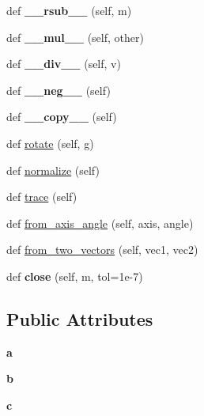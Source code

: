 \begin{DoxyCompactItemize}
def {\bfseries \+\_\+\+\_\+rsub\+\_\+\+\_\+} (self, m)
\item 
\mbox{\label{classpymavlink_1_1rotmat_1_1Matrix3_a1ef3cbd6ff8b2a5552ab1815368bea73}} 
def {\bfseries \+\_\+\+\_\+mul\+\_\+\+\_\+} (self, other)
\item 
\mbox{\label{classpymavlink_1_1rotmat_1_1Matrix3_a33b7d26f77f11815be897f21a2f846be}} 
def {\bfseries \+\_\+\+\_\+div\+\_\+\+\_\+} (self, v)
\item 
\mbox{\label{classpymavlink_1_1rotmat_1_1Matrix3_a52ca10cafc20362cc59aa47dec8733e8}} 
def {\bfseries \+\_\+\+\_\+neg\+\_\+\+\_\+} (self)
\item 
\mbox{\label{classpymavlink_1_1rotmat_1_1Matrix3_aaab43e8d595d0c4422b5561db2a0b89f}} 
def {\bfseries \+\_\+\+\_\+copy\+\_\+\+\_\+} (self)
\item 
def \hyperlink{classpymavlink_1_1rotmat_1_1Matrix3_a68eaac6b40df4fda8589403cfb1c6f47}{rotate} (self, g)
\item 
def \hyperlink{classpymavlink_1_1rotmat_1_1Matrix3_a8dcef0074eff59c72566574f380a8487}{normalize} (self)
\item 
def \hyperlink{classpymavlink_1_1rotmat_1_1Matrix3_ac10cb8963613b9febb43869cd22c58cf}{trace} (self)
\item 
def \hyperlink{classpymavlink_1_1rotmat_1_1Matrix3_a65a0956b9e01314396316e247ae56ed8}{from\+\_\+axis\+\_\+angle} (self, axis, angle)
\item 
def \hyperlink{classpymavlink_1_1rotmat_1_1Matrix3_a2c4686d62f2d2bf82c4bbcce63e341f0}{from\+\_\+two\+\_\+vectors} (self, vec1, vec2)
\item 
\mbox{\label{classpymavlink_1_1rotmat_1_1Matrix3_a16559bd4505650c03021ace738bb40f8}} 
def {\bfseries close} (self, m, tol=1e-\/7)
\end{DoxyCompactItemize}
\subsection*{Public Attributes}
\begin{DoxyCompactItemize}
\item 
\mbox{\label{classpymavlink_1_1rotmat_1_1Matrix3_a6e59a3b14add2220f8a218e12d631464}} 
{\bfseries a}
\item 
\mbox{\label{classpymavlink_1_1rotmat_1_1Matrix3_a4bb23872122a20e4b5a6de2e2a327a2f}} 
{\bfseries b}
\item 
\mbox{\label{classpymavlink_1_1rotmat_1_1Matrix3_aaad9f3e5cf235b0922738d71dc08e6b7}} 
{\bfseries c}
\end{DoxyCompactItemize}
